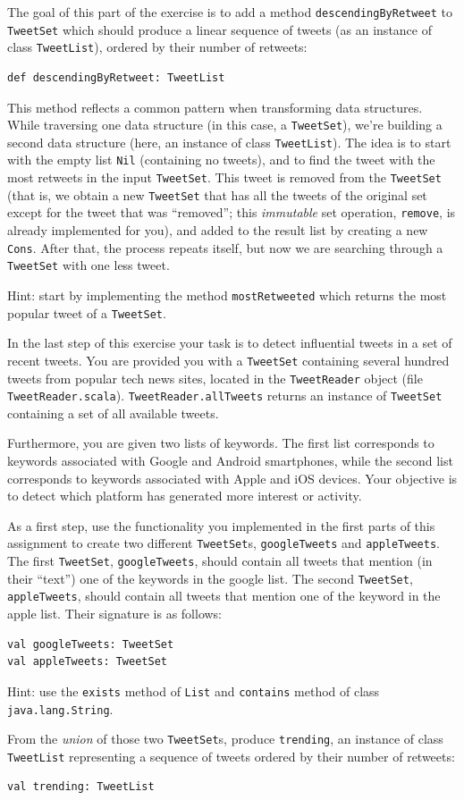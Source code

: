 \documentclass[a4paper,12pt]{exam}
\begin{document}
\begin{questions}
The goal of this part of the exercise is to add a method 
\verb!descendingByRetweet! to \verb!TweetSet! which should produce a linear sequence of 
tweets (as an instance of class \verb!TweetList!), ordered by their number of retweets:
\begin{Verbatim}
def descendingByRetweet: TweetList	
\end{Verbatim}
This method reflects a common pattern when transforming data structures. 
While traversing one data structure (in this case, a \verb!TweetSet!), 
we’re building a second data structure (here, an instance of class \verb!TweetList!). 
The idea is to start with the empty list \verb!Nil! (containing no tweets), 
and to find the tweet with the most retweets in the input \verb!TweetSet!. 
This tweet is removed from the \verb!TweetSet! (that is, we obtain a new \verb!TweetSet! 
that has all the tweets of the original set except for the tweet that was ``removed''; 
this \emph{immutable} set operation, \verb!remove!, 
is already implemented for you), and added to the result list by creating a new \verb!Cons!. 
After that, the process repeats itself, but now we are searching through a \verb!TweetSet! 
with one less tweet.

Hint: start by implementing the method \verb!mostRetweeted! which returns the most 
popular tweet of a \verb!TweetSet!.

\question
In the last step of this exercise your task is to detect influential tweets in a set of 
recent tweets. You are provided you with a \verb!TweetSet! containing several hundred tweets 
from popular tech news sites, located in the \verb!TweetReader! object (file 
\verb!TweetReader.scala!). \verb!TweetReader.allTweets! returns an instance of 
\verb!TweetSet! containing a set of all available tweets.

Furthermore, you are given two lists of keywords. The first list corresponds to 
keywords associated with Google and Android smartphones, while the second list corresponds 
to keywords associated with Apple and iOS devices. Your objective is to detect which 
platform has generated more interest or activity.

As a first step, use the functionality you implemented in the first parts of this assignment 
to create two different \verb!TweetSet!s, \verb!googleTweets! and \verb!appleTweets!. 
The first \verb!TweetSet!, \verb!googleTweets!, should contain all tweets that 
mention (in their ``text'') one of the keywords in the google list. 
The second \verb!TweetSet!, \verb!appleTweets!, should contain all tweets that mention 
one of the keyword in the apple list. Their signature is as follows:
\begin{Verbatim}
val googleTweets: TweetSet
val appleTweets: TweetSet	
\end{Verbatim}
Hint: use the \verb!exists! method of \verb!List! and \verb!contains! 
method of class \verb!java.lang.String!.

From the \emph{union} of those two \verb!TweetSet!s, produce \verb!trending!, 
an instance of class \verb!TweetList! representing a sequence of tweets ordered 
by their number of retweets:
\begin{Verbatim}
val trending: TweetList	
\end{Verbatim}

\end{questions}
\end{document}
